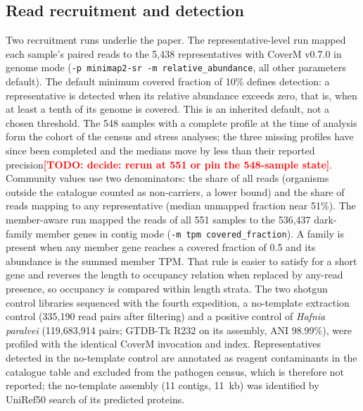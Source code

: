 \documentclass[11pt]{article}
\providecommand{\todo}[1]{\textcolor{red}{\textbf{[TODO: #1]}}}
\begin{document}
\subsection*{Read recruitment and detection}
Two recruitment runs underlie the paper. The representative-level run mapped each sample's paired
reads to the 5{,}438 representatives with CoverM v0.7.0 \citep{aroney2025coverm} in genome mode
(\texttt{-p minimap2-sr -m relative\_abundance}, all other parameters default). The default minimum
covered fraction of 10\% defines detection: a representative is detected when its relative abundance
exceeds zero, that is, when at least a tenth of its genome is covered. This is an inherited default,
not a chosen threshold. The 548 samples with a complete profile at the time of analysis form the
cohort of the census and stress analyses; the three missing profiles have since been completed and
the medians move by less than their reported precision\todo{decide: rerun at 551 or pin the
548-sample state}. Community values use two denominators: the share of all reads (organisms outside
the catalogue counted as non-carriers, a lower bound) and the share of reads mapping to any
representative (median unmapped fraction near 51\%). The member-aware run mapped the reads of all 551
samples to the 536{,}437 dark-family member genes in contig mode (\texttt{-m tpm covered\_fraction}).
A family is present when any member gene reaches a covered fraction of 0.5 and its abundance is the
summed member TPM. That rule is easier to satisfy for a short gene and reverses the length to
occupancy relation when replaced by any-read presence, so occupancy is compared within length strata.
The two shotgun control libraries sequenced with the fourth expedition, a no-template extraction
control (335{,}190 read pairs after filtering) and a positive control of \emph{Hafnia paralvei}
(119{,}683{,}914 pairs; GTDB-Tk R232 on its assembly, ANI 98.99\%), were profiled with the identical
CoverM invocation and index. Representatives detected in the no-template control are annotated as
reagent contaminants in the catalogue table and excluded from the pathogen census, which is
therefore not reported; the no-template assembly (11 contigs, 11~kb) was identified by UniRef50
search of its predicted proteins.
\end{document}
